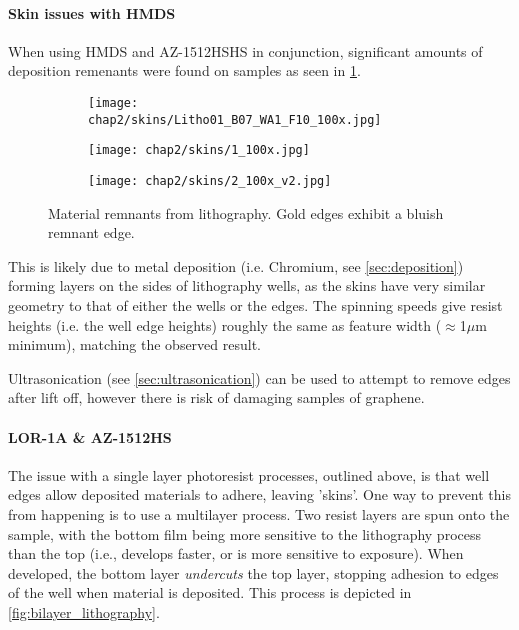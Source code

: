 \documentclass[../../Matt_Gebert_Honours_Thesis.tex]{subfiles}
\begin{document}
	\paragraph{Skin issues with HMDS}\label{sec:skin_issues}
	When using HMDS and AZ-1512HSHS in conjunction, significant amounts of deposition remenants were found on samples as seen in \cref{fig:lithography_skins}.
	
	\begin{figure}[H]
		\centering
		\begin{subfigure}[b]{0.3\textwidth}
			\texttt{[image: chap2/skins/Litho01\_B07\_WA1\_F10\_100x.jpg]}
		\end{subfigure}
		\begin{subfigure}[b]{0.3\textwidth}
			\texttt{[image: chap2/skins/1\_100x.jpg]}
		\end{subfigure}
		\begin{subfigure}[b]{0.3\textwidth}
			\texttt{[image: chap2/skins/2\_100x\_v2.jpg]}
		\end{subfigure}
		\caption[Material remanants from lithography]{Material remnants from lithography. Gold edges exhibit a bluish remnant edge.}\label{fig:lithography_skins}
	\end{figure}
	
	This is likely due to metal deposition (i.e. Chromium, see \cref{sec:deposition}) forming layers on the sides of lithography wells, as the skins have very similar geometry to that of either the wells or the edges. The spinning speeds give resist heights (i.e. the well edge heights) roughly the same as feature width ($\approx$1$\mu$m minimum), matching the observed result. 
	
	Ultrasonication (see \cref{sec:ultrasonication}) can be used to attempt to remove edges after lift off, however there is risk of damaging samples of graphene.
	
	\paragraph{LOR-1A \& AZ-1512HS}
	The issue with a single layer photoresist processes, outlined above, is that well edges allow deposited materials to adhere, leaving 'skins'. One way to prevent this from happening is to use a multilayer process. Two resist layers are spun onto the sample, with the bottom film being more sensitive to the lithography process than the top (i.e., develops faster, or is more sensitive to exposure). When developed, the bottom layer \textit{undercuts} the top layer, stopping adhesion to edges of the well when material is deposited. This process is depicted in \cref{fig:bilayer_lithography}.
	
\end{document}
